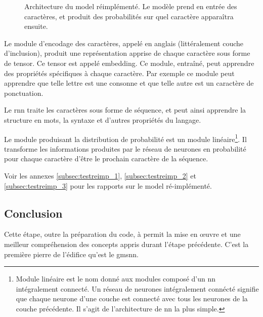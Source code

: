 \begin{figure}[h]
	\centering
	\scalebox{1}{}
	\caption[Architecture du  réimplémenté]{Architecture du \gls{model} réimplémenté. Le modèle prend en entrée des caractères, et produit des probabilités sur quel caractère apparaîtra ensuite.}\label{fig:reimplement}
\end{figure}

Le module d'encodage des caractères, appelé  en anglais (littéralement \og couche d'inclusion\fg{}), produit une représentation apprise de chaque caractère sous forme de \gls{tensor}. Ce \gls{tensor} est appelé \gls{embedding}. Ce module, entraîné, peut apprendre des propriétés spécifiques à chaque caractère. Par exemple ce module peut apprendre que telle lettre est une consonne et que telle autre est un caractère de ponctuation. \label{def:embeding}

Le \gls{rnn} traite les caractères sous forme de séquence, et peut ainsi apprendre la structure en mots, la syntaxe et d'autres propriétés du langage.

Le module produisant la distribution de probabilité est un module linéaire\footnote{\og Module linéaire \fg{} est le nom donné aux modules composé d'un \gls{nn} intégralement connecté. Un réseau de neurones intégralement connécté signifie que chaque neurone d'une couche est connecté avec tous les neurones de la couche précédente. Il s'agit de l'architecture de \gls{nn} la plus simple.\label{def:fully_connected}\label{def:lin_module}}.
Il transforme les informations produites par le réseau de neurones en probabilité pour chaque caractère d'être le prochain caractère de la séquence.

Voir les annexes \ref{subsec:testreimp_1}, \ref{subsec:testreimp_2} et \ref{subsec:testreimp_3} pour les rapports sur le \gls{model} ré-implémenté. 

\subsection{Conclusion}
Cette étape, outre la préparation du code, à permit la mise en œuvre et une meilleur compréhension des concepts appris durant l’étape précédente. C'est la première pierre de l'édifice qu'est le \gls{gmsnn}.